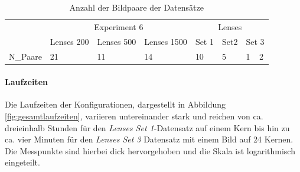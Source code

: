 \begin{table}
	\begin{tabularx}{\textwidth}{@{} XXXXXXXX @{}}
		\toprule
		& \multicolumn{3}{c}{Experiment 6} & \multicolumn{4}{c}{Lenses} \\
		\cmidrule(lr){2-4}
		\cmidrule(lr){5-8}
		& Lenses 200 & Lenses 500 & Lenses 1500 & Set 1 & Set2 & \multicolumn{2}{X}{Set 3} \\
		\hline
		\gls{N_Paare} & 21 & 11 & 14 & 10 & 5 & 1 & 2 \\
		\bottomrule
	\end{tabularx}
	\caption{Anzahl der Bildpaare der Datensätze}
	\label{tab:datasets}
\end{table}

\paragraph{Laufzeiten}

Die Laufzeiten der Konfigurationen, dargestellt in Abbildung \ref{fig:gesamtlaufzeiten}, variieren untereinander stark und reichen von ca. dreieinhalb Stunden für den \textit{Lenses Set 1}-Datensatz auf einem Kern bis hin zu ca. vier Minuten für den \textit{Lenses Set 3} Datensatz mit einem Bild auf 24 Kernen. Die Messpunkte sind hierbei dick hervorgehoben und die Skala ist logarithmisch eingeteilt. 

